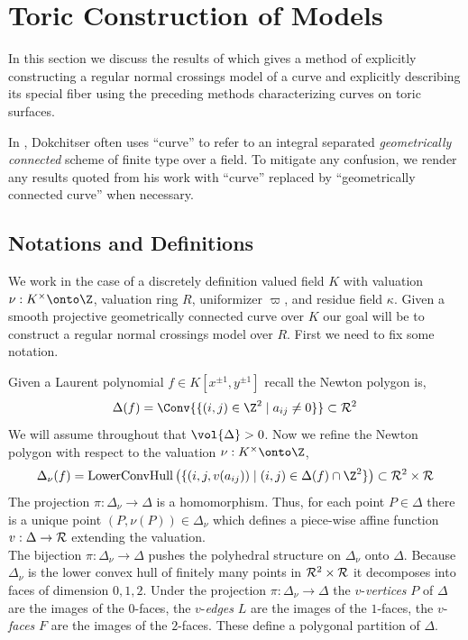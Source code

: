 
\section{Toric Construction of Models}

In this section we discuss the results of \cite{tim} which gives a method of explicitly constructing a regular normal crossings model of a curve and explicitly describing its special fiber using the preceding methods characterizing curves on toric surfaces. 
\begin{rmk}
In \cite{tim}, Dokchitser often uses ``curve'' to refer to an integral separated \textit{geometrically connected} scheme of finite type over a field. To mitigate any confusion, we render any results quoted from his work with ``curve'' replaced by ``geometrically connected curve'' when necessary.
\end{rmk}

\subsection{Notations and Definitions}

We work in the case of a discretely definition valued field $K$ with valuation $\nu : K^\times \onto \Z$, valuation ring $R$, uniformizer $\varpi$, and residue field $\kappa$. Given a smooth projective geometrically connected curve over $K$ our goal will be to construct a regular normal crossings model over $R$. First we need to fix some notation.

\begin{defn}
Given a Laurent polynomial $f \in K[x^{\pm 1}, y^{\pm 1}]$ recall the Newton polygon is,
\[ \Delta(f) = \Conv{ \{ (i,j) \in \Z^2 \mid a_{ij} \neq 0 \} } \subset \R^2 \]
We will assume throughout that $\vol{\Delta} > 0$. 
Now we refine the Newton polygon with respect to the valuation $\nu : K^\times \onto \Z$,
\[ \Delta_\nu(f) = \mathrm{LowerConvHull} \left( \{ (i, j, v(a_{ij})) \mid (i, j) \in \Delta(f) \cap \Z^2 \} \right) \subset \R^2 \times \R \]
The projection $\pi : \Delta_\nu \to \Delta$ is a homomorphism. Thus,
for each point $P \in \Delta$ there is a unique point $(P, \nu(P)) \in \Delta_\nu$ which defines a piece-wise affine function $v : \Delta \to \mathcal{R}$ extending the valuation. 
\bigskip\\
The bijection $\pi : \Delta_\nu \to \Delta$ pushes the polyhedral structure on $\Delta_\nu$ onto $\Delta$. Because $\Delta_\nu$ is the lower convex hull of finitely many points in $\mathcal{R}^2 \times \mathcal{R}$ it decomposes into faces of dimension $0, 1, 2$. Under the projection $\pi : \Delta_\nu \to \Delta$ the $v$-\textit{vertices} $P$ of $\Delta$ are the images of the $0$-faces, the $v$-\textit{edges} $L$ are the images of the $1$-faces, the $v$-\textit{faces} $F$ are the images of the $2$-faces. These define a polygonal partition of $\Delta$. 
\end{defn}

